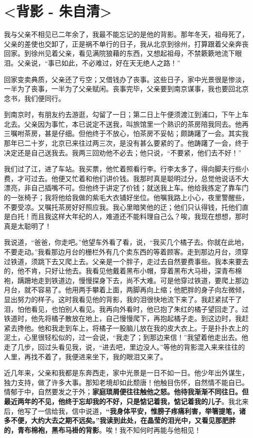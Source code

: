 \documentclass[UTF8,a4paper,8pt]{ctexbook}
\begin{document}
\newpage
\section{<背影 - 朱自清>}
	我与父亲不相见已二年余了，我最不能忘记的是他的背影。那年冬天，祖母死了，父亲的差使也交卸了，正是祸不单行的日子，我从北京到徐州，打算跟着父亲奔丧回家。到徐州见着父亲，看见满院狼藉的东西，又想起祖母，不禁簌簌地流下眼泪。父亲说，“事已如此，不必难过，好在天无绝人之路！”
	
	回家变卖典质，父亲还了亏空；又借钱办了丧事。这些日子，家中光景很是惨淡，一半为了丧事，一半为了父亲赋闲。丧事完毕，父亲要到南京谋事，我也要回北京念书，我们便同行。
	
	到南京时，有朋友约去游逛，勾留了一日；第二日上午便须渡江到浦口，下午上车北去。父亲因为事忙，本已说定不送我，叫旅馆里一个熟识的茶房陪我同去。他再三嘱咐茶房，甚是仔细。但他终于不放心，怕茶房不妥帖；颇踌躇了一会。其实我那年已二十岁，北京已来往过两三次，是没有甚么要紧的了。他踌躇了一会，终于决定还是自己送我去。我两三回劝他不必去；他只说，“不要紧，他们去不好！”
	
	我们过了江，进了车站。我买票，他忙着照看行李。行李太多了，得向脚夫行些小费，才可过去。他便又忙着和他们讲价钱。我那时真是聪明过分，总觉他说话不大漂亮，非自己插嘴不可。但他终于讲定了价钱；就送我上车。他给我拣定了靠车门的一张椅子；我将他给我做的紫毛大衣铺好坐位。他嘱我路上小心，夜里警醒些，不要受凉。又嘱托茶房好好照应我。我心里暗笑他的迂；他们只认得钱，托他们直是白托！而且我这样大年纪的人，难道还不能料理自己么？唉，我现在想想，那时真是太聪明了！
	
	我说道，“爸爸，你走吧。”他望车外看了看，说，“我买几个橘子去。你就在此地，不要走动。”我看那边月台的栅栏外有几个卖东西的等着顾客。走到那边月台，须穿过铁道，须跳下去又爬上去。父亲是一个胖子，走过去自然要费事些。我本来要去的，他不肯，只好让他去。我看见他戴着黑布小帽，穿着黑布大马褂，深青布棉袍，蹒跚地走到铁道边，慢慢探身下去，尚不大难。可是他穿过铁道，要爬上那边月台，就不容易了。他用两手攀着上面，两脚再向上缩；他肥胖的身子向左微倾，显出努力的样子。这时我看见他的背影，我的泪很快地流下来了。我赶紧拭干了泪，怕他看见，也怕别人看见。我再向外看时，他已抱了朱红的橘子望回走了。过铁道时，他先将橘子散放在地上，自己慢慢爬下，再抱起橘子走。到这边时，我赶紧去搀他。他和我走到车上，将橘子一股脑儿放在我的皮大衣上。于是扑扑衣上的泥土，心里很轻松似的，过一会说，“我走了；到那边来信！”我望着他走出去。他走了几步，回过头看见我，说，“进去吧，里边没人。”等他的背影混入来来往往的人里，再找不着了，我便进来坐下，我的眼泪又来了。
	
	近几年来，父亲和我都是东奔西走，家中光景是一日不如一日。他少年出外谋生，独力支持，做了许多大事。那知老境却如此颓唐！他触目伤怀，自然情不能自已。情郁于中，自然要发之于外；\textbf{家庭琐屑便往往触他之怒。他待我渐渐不同往日。但最近两年的不见，他终于忘却我的不好，只是惦记着我，惦记着我的儿子}。我北来后，他写了一信给我，信中说道，\textbf{“我身体平安，惟膀子疼痛利害，举箸提笔，诸多不便，大约大去之期不远矣。”我读到此处，在晶莹的泪光中，又看见那肥胖的，青布棉袍，黑布马褂的背影}。唉！我不知何时再能与他相见！
		
\end{document}
